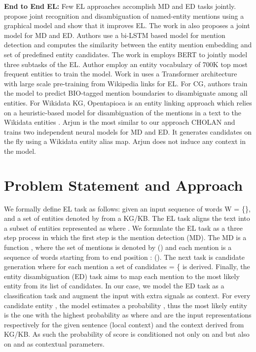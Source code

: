\documentclass[11pt,a4paper]{article}
\begin{document}
\textbf{End to End EL:} Few EL approaches accomplish MD and ED tasks jointly. \cite{nguyen2016j} propose joint recognition and disambiguation of named-entity mentions
using a graphical model and show that it improves EL. 
The work in \cite{kolitsas2018end} also proposes a joint model for MD and ED. Authors use a bi-LSTM based model for mention detection and computes the similarity between the entity mention embedding and set of predefined entity candidates.
The work in \cite{broscheit2019investigating} employs BERT to jointly model three subtasks of the EL. Author employ an entity vocabulary of 700K top most frequent entities to train the model.
Work in \cite{evry2020empirical} uses a Transformer architecture with large scale pre-training from Wikipedia links for EL. For CG, authors train the model to predict BIO-tagged mention boundaries to disambiguate among all entities. For Wikidata KG, Opentapioca is an entity linking approach which relies on a heuristic-based model for disambiguation of the mentions in a text to the Wikidata entities \cite{delpeuch2019opentapioca}. Arjun \cite{Mulang2019ContextawareEL} is the most similar to our approach CHOLAN and trains two independent neural models for MD and ED. It generates candidates on the fly using a Wikidata entity alias map. Arjun does not induce any context in the model. 
\section{Problem Statement and Approach}

\label{sec:problem}
We formally define EL task as follows: given an input sequence of words W = \{\}, and a 
set of entities denoted by  from a KG/KB. The EL task aligns the text into a subset of entities represented as  where . We formulate the EL task as a three step process in which the first step is the mention detection (MD).  
The MD is a function , where the set of mentions is denoted by  () and each mention  is a sequence of words starting from  to end position :  (). 
The next task is candidate generation where for each mention   a set of candidates = \{ is derived.
Finally, the entity disambiguation (ED) task aims to map each mention   to the most likely entity from its list of candidates.
In our case, we model the ED task as a classification task and augment the input with extra signals as context. For every candidate entity , the model estimates a probability , thus the most likely entity is the one with the highest probability as  where  and  are the input representations respectively for the given sentence (local context) and the context derived from KG/KB. As such the probability of score  is conditioned not only on  and  but also on  and  as contextual parameters.
\end{document}
